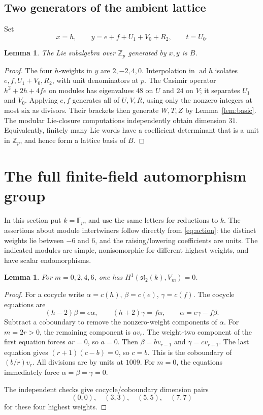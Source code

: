 \documentclass[11pt]{article}
\newtheorem{lemma}[theorem]{Lemma}
\theoremstyle{definition}\newtheorem{definition}[theorem]{Definition}
\theoremstyle{remark}\newtheorem{remark}[theorem]{Remark}
\DeclareMathOperator{\ad}{ad}
\newcommand{\Zp}{\mathbb Z_p}
\newcommand{\Fp}{\mathbb F_p}
\begin{document}
\subsection{Two generators of the ambient lattice}
Set
\begin{equation}\label{eq:xy}
 x=h,\qquad y=e+f+U_1+V_0+R_2,\qquad t=U_0.
\end{equation}
\begin{lemma}\label{lem:generators}
The Lie subalgebra over $\Zp$ generated by $x,y$ is $B$.
\end{lemma}
\begin{proof}
The four $h$-weights in $y$ are $2,-2,4,0$. Interpolation in $\ad h$ isolates
$e,f,U_1+V_0,R_2$, with unit denominators at $p$. The Casimir operator
$h^2+2h+4fe$ on modules has eigenvalues $48$ on $U$ and $24$ on $V$;
it separates $U_1$ and $V_0$. Applying $e,f$ generates all of $U,V,R$,
using only the nonzero integers at most six as divisors. Their brackets
then generate $W,T,Z$ by Lemma~\ref{lem:basic}.
The modular Lie-closure computations independently obtain dimension $31$.
Equivalently, finitely many Lie words have a coefficient determinant that
is a unit in $\Zp$, and hence form a lattice basis of $B$.
\end{proof}

\section{The full finite-field automorphism group}
In this section put $k=\Fp$, and use the same letters for reductions to $k$.
The assertions about module intertwiners follow directly from
\eqref{eq:action}: the distinct weights lie between $-6$ and $6$, and the
raising/lowering coefficients are units. The indicated modules are simple,
nonisomorphic for different highest weights, and have scalar endomorphisms.

\begin{lemma}\label{lem:H1}
For $m=0,2,4,6$, one has $H^1(\mathfrak{sl}_2(k),V_m)=0$.
\end{lemma}
\begin{proof}
For a cocycle write $\alpha=c(h)$, $\beta=c(e)$, $\gamma=c(f)$.
The cocycle equations are
\[
 (h-2)\beta=e\alpha,\qquad (h+2)\gamma=f\alpha,\qquad
 \alpha=e\gamma-f\beta.
\]
Subtract a coboundary to remove the nonzero-weight components of $\alpha$.
For $m=2r>0$, the remaining component is $a v_r$. The weight-two component
of the first equation forces $ar=0$, so $a=0$. Then $\beta=bv_{r-1}$ and
$\gamma=cv_{r+1}$. The last equation gives $(r+1)(c-b)=0$, so $c=b$.
This is the coboundary of $(b/r)v_r$. All divisions are by units at $1009$.
For $m=0$, the equations immediately force $\alpha=\beta=\gamma=0$.

The independent checks give cocycle/coboundary dimension pairs
\[ (0,0),\quad (3,3),\quad (5,5),\quad (7,7) \]
for these four highest weights.
\end{proof}
\end{document}
